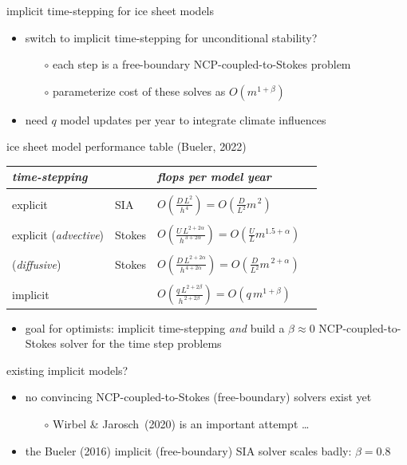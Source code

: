 \documentclass[svgnames,
               hyperref={colorlinks,citecolor=DeepPink4,linkcolor=FireBrick,urlcolor=Maroon},
               usepdftitle=false]  %
               {beamer}
\newcommand{\oo}[1]{\displaystyle O\left(#1\right)}
\begin{document}
\begin{frame}{implicit time-stepping for ice sheet models}

\begin{itemize}
\item switch to \alert{implicit time-stepping} for unconditional stability?
    \begin{itemize}
    \item[$\circ$] each step is a \alert{free-boundary} NCP-coupled-to-Stokes problem
    \item[$\circ$] parameterize cost of these solves as $O(m^{1+\beta})$
    \end{itemize}
\item need $q$ model updates per year to integrate climate influences
\end{itemize}
\end{frame}


\begin{frame}{ice sheet model performance table (Bueler, 2022)}

\begin{tabular}{llll}
\emph{time-stepping} &  & \emph{flops per model year} \\ \hline
\\
explicit & SIA    & $\oo{\frac{D\, L^2}{h^{\,4}}} = \oo{\frac{D}{L^2} m^{\,2}}$ \\
\\
explicit ({\footnotesize \emph{advective}}) & Stokes \phantom{xxxx} & $\oo{\frac{U \,L^{2+2\alpha}}{h^{\,3+2\alpha}}} = \oo{\frac{U}{L} m^{1.5+\alpha}}$ \\
\\
\phantom{explicit} ({\footnotesize \emph{diffusive}})  & Stokes & $\oo{\frac{D\, L^{2+2\alpha}}{h^{\,4+2\alpha}}} = \oo{\frac{D}{L^2} m^{\,2+\alpha}}$ \\
\\
implicit & & $\oo{\frac{q\, L^{2+2\beta}}{h^{\,2+2\beta}}} = \oo{q\, m^{1+\beta}}$
\end{tabular}

\bigskip
\begin{itemize}
\item goal for optimists: implicit time-stepping \emph{and} build a $\beta \approx 0$ NCP-coupled-to-Stokes solver for the time step problems
\end{itemize}
\end{frame}


\begin{frame}{existing implicit models?}

\begin{itemize}
\item no convincing NCP-coupled-to-Stokes (free-boundary) solvers exist yet
    \begin{itemize}
    \item[$\circ$] Wirbel \& Jarosch~(2020) is an important attempt \dots
    \end{itemize}
\item the Bueler (2016) implicit (free-boundary) SIA solver scales badly: $\beta=0.8$
\end{itemize}
\end{frame}
\end{document}
